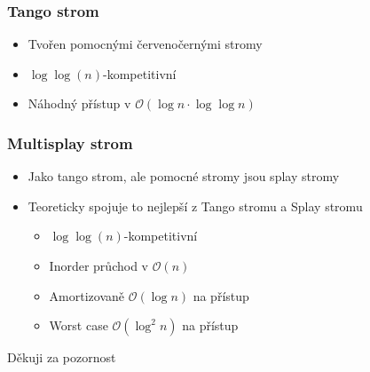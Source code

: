 \documentclass{beamer}
\begin{document}
\begin{frame}
\frametitle{Tango strom}
\begin{itemize}
\item Tvořen pomocnými červenočernými stromy
\item $\log\log(n)$-kompetitivní
\item Náhodný přístup v $\mathcal O(\log n \cdot \log\log n)$
\end{itemize}
\end{frame}

\begin{frame}
\frametitle{Multisplay strom}
\begin{itemize}
\item Jako tango strom, ale pomocné stromy jsou splay stromy
\item Teoreticky spojuje to nejlepší z Tango stromu a Splay stromu
\begin{itemize}
\item $\log\log(n)$-kompetitivní
\item Inorder průchod v $\mathcal O(n)$
\item Amortizovaně $\mathcal O(\log n)$ na přístup
\item Worst case $\mathcal O(\log^2 n)$ na přístup
\end{itemize}
\end{itemize}
\end{frame}

\begin{frame}
\Huge{\centerline{Děkuji za pozornost}}
\end{frame}

\end{document}
